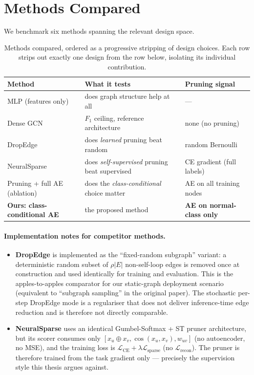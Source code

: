 \documentclass[11pt,a4paper]{report}
\theoremstyle{definition}
\theoremstyle{remark}
\begin{document}
\section{Methods Compared}

We benchmark six methods spanning the relevant design space.

\begin{table}[h]
\centering
\caption{Methods compared, ordered as a progressive stripping of design
choices. Each row strips out exactly one design from the row below,
isolating its individual contribution.}
\label{tab:methods}
\small
\setlength{\tabcolsep}{4pt}
\begin{tabular}{p{3.5cm}p{5.0cm}p{4.7cm}}
\toprule
\textbf{Method} & \textbf{What it tests} & \textbf{Pruning signal} \\
\midrule
MLP (features only) & does graph structure help at all & --- \\
Dense GCN \cite{kipf2017semi} & $F_1$ ceiling, reference architecture & none (no pruning) \\
DropEdge \cite{rong2020dropedge} & does \emph{learned} pruning beat random & random Bernoulli \\
NeuralSparse \cite{zheng2020neuralsparse} & does \emph{self-supervised} pruning beat supervised & CE gradient (full labels) \\
Pruning + full AE (ablation) & does the \emph{class-conditional} choice matter & AE on all training nodes \\
\textbf{Ours: class-conditional AE} & the proposed method & \textbf{AE on normal-class only} \\
\bottomrule
\end{tabular}
\end{table}

\paragraph{Implementation notes for competitor methods.}
\begin{itemize}[leftmargin=1.6em]
\item \textbf{DropEdge} is implemented as the ``fixed-random subgraph''
variant: a deterministic random subset of $\rho|E|$ non-self-loop edges
is removed once at construction and used identically for training and
evaluation. This is the apples-to-apples comparator for our static-graph
deployment scenario (equivalent to ``subgraph sampling'' in the original
paper). The stochastic per-step DropEdge mode is a regulariser that does
not deliver inference-time edge reduction and is therefore not directly
comparable.
\item \textbf{NeuralSparse} uses an identical Gumbel-Softmax + ST pruner
architecture, but its scorer consumes only
$[x_u\oplus x_v,\cos(x_u,x_v),w_{uv}]$ (no autoencoder, no MSE), and the
training loss is $\mathcal{L}_{\text{CE}}+\lambda\mathcal{L}_{\text{sparse}}$
(no $\mathcal{L}_{\text{recon}}$). The pruner is therefore trained from
the task gradient only --- precisely the supervision style this thesis
argues against.
\end{itemize}
\end{document}
